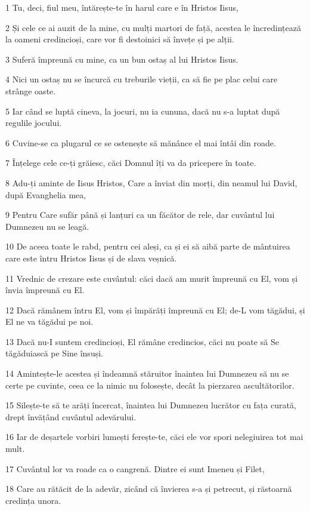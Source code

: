 \par 1 Tu, deci, fiul meu, întărește-te în harul care e în Hristos Iisus,
\par 2 Și cele ce ai auzit de la mine, cu mulți martori de față, acestea le încredințează la oameni credincioși, care vor fi destoinici să învețe și pe alții.
\par 3 Suferă împreună cu mine, ca un bun ostaș al lui Hristos Iisus.
\par 4 Nici un ostaș nu se încurcă cu treburile vieții, ca să fie pe plac celui care strânge oaste.
\par 5 Iar când se luptă cineva, la jocuri, nu ia cununa, dacă nu s-a luptat după regulile jocului.
\par 6 Cuvine-se ca plugarul ce se ostenește să mănânce el mai întâi din roade.
\par 7 Înțelege cele ce-ți grăiesc, căci Domnul îți va da pricepere în toate.
\par 8 Adu-ți aminte de Iisus Hristos, Care a înviat din morți, din neamul lui David, după Evanghelia mea,
\par 9 Pentru Care sufăr până și lanțuri ca un făcător de rele, dar cuvântul lui Dumnezeu nu se leagă.
\par 10 De aceea toate le rabd, pentru cei aleși, ca și ei să aibă parte de mântuirea care este întru Hristos Iisus și de slava veșnică.
\par 11 Vrednic de crezare este cuvântul: căci dacă am murit împreună cu El, vom și învia împreună cu El.
\par 12 Dacă rămânem întru El, vom și împărăți împreună cu El; de-L vom tăgădui, și El ne va tăgădui pe noi.
\par 13 Dacă nu-I suntem credincioși, El rămâne credincios, căci nu poate să Se tăgăduiască pe Sine însuși.
\par 14 Amintește-le acestea și îndeamnă stăruitor înaintea lui Dumnezeu să nu se certe pe cuvinte, ceea ce la nimic nu folosește, decât la pierzarea ascultătorilor.
\par 15 Silește-te să te arăți încercat, înaintea lui Dumnezeu lucrător cu fața curată, drept învățând cuvântul adevărului.
\par 16 Iar de deșartele vorbiri lumești ferește-te, căci ele vor spori nelegiuirea tot mai mult.
\par 17 Cuvântul lor va roade ca o cangrenă. Dintre ei sunt Imeneu și Filet,
\par 18 Care au rătăcit de la adevăr, zicând că învierea s-a și petrecut, și răstoarnă credința unora.
